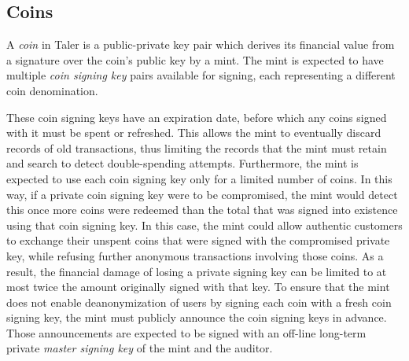 \documentclass{llncs}
\begin{document}


\subsection{Coins}

A \emph{coin} in Taler is a public-private key pair which derives its
financial value from a signature over the coin's public key by a mint.
The mint is expected to have multiple {\em coin signing key} pairs
available for signing, each representing a different coin
denomination.

These coin signing keys have an expiration date, before which any coins
signed with it must be spent or refreshed.  This allows the mint to
eventually discard records of old transactions, thus limiting the
records that the mint must retain and search to detect double-spending
attempts.  Furthermore, the mint is expected to use each coin signing
key only for a limited number of coins.
In this way, if a private coin signing key were to be compromised,
the mint would detect this once more coins were redeemed than the total
that was signed into existence using that coin signing key.
In this case, the mint could allow authentic customers to exchange their
unspent coins that were signed with the compromised private key,
while refusing further anonymous transactions involving those coins.
As a result, the financial damage of losing a private signing key can be
limited to at most twice the amount originally signed with that key.
To ensure that the mint does not enable deanonymization of users by
signing each coin with a fresh coin signing key, the mint must publicly
announce the coin signing keys in advance.  Those announcements are
expected to be signed with an off-line long-term private {\em master
signing key} of the mint and the auditor.
\end{document}
